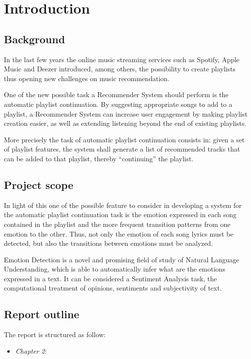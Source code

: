 \chapter{Introduction}
\section{Background}
In the last few years the online music streaming services such as Spotify, Apple Music and Deezer introduced, among others,  the possibility to create playlists thus opening new challenges on music recommendation.\par
One of the new possible task a Recommender System should perform is the automatic playlist continuation. By suggesting appropriate songs to add to a playlist, a Recommender System can increase user engagement by making playlist creation easier, as well as extending listening beyond the end of existing playlists. \par
More precisely the task of automatic playlist continuation consists in: given a set of playlist features, the system shall generate a list of recommended tracks that can be added to that playlist, thereby ``continuing'' the playlist. \par

\section{Project scope}
In light of this one of the possible feature to consider in developing a system for the automatic playlist continuation task is the emotion expressed in each song contained in the playlist and the more frequent transition patterns from one emotion to the other. Thus, not only the emotion of each song lyrics must be detected, but also the transitions between emotions must be analyzed. \par
Emotion Detection is a novel and promising field of study of Natural Language Understanding, which is able to automatically infer what are the emotions expressed in a text. It can be considered a Sentiment Analysis task, the computational treatment of opinions, sentiments and subjectivity of text. \par

\section{Report outline}
The report is structured as follow: 
\begin{itemize}
\item \textit{Chapter 2}: 
\end{itemize}











